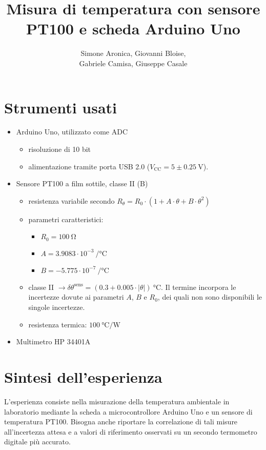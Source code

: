 \documentclass{article}
\title{Misura di temperatura con
sensore PT100 e
scheda Arduino Uno}
\author{Simone Aronica, Giovanni Bloise, \\
Gabriele Camisa, Giuseppe Casale}
\begin{document}
\maketitle
\tableofcontents
\pagebreak

\section{Strumenti usati}
\begin{itemize}
    \item Arduino Uno, utilizzato come ADC 
    \begin{itemize}
        \item risoluzione di 10 bit 
        \item alimentazione tramite porta USB 2.0 ($V_{\text{CC}} = 5 \pm \SI{0.25}{\volt}$).
    \end{itemize}
    \item Sensore PT100 a film sottile, classe II (B) 
    \begin{itemize}
        \item resistenza variabile secondo $R_{\theta}=R_0\cdot\left(1+A\cdot\theta+B\cdot\theta^2\right)$
        \item parametri caratteristici:
        \begin{itemize}
            \item $R_0=\SI{100}{\ohm}$
            \item $A=3.9083\cdot10^{-3}\SI{}{\per\celsius}$
            \item $B=-5.775\cdot10^{-7}\SI{}{\per\celsius}$
        \end{itemize}
    \item classe II $\rightarrow \delta\theta^\text{sens}=(0.3+0.005\cdot|\theta|)\SI{}{\celsius}$. Il termine incorpora le incertezze dovute ai parametri $A$, $B$ e $R_0$, dei quali non sono disponibili le singole incertezze.
    \item resistenza termica: $\SI{100}{\celsius\per\watt}$
    \end{itemize}
    \item Multimetro HP 34401A
\end{itemize}

\section{Sintesi dell'esperienza}
L'esperienza consiste nella misurazione della temperatura ambientale in laboratorio mediante la scheda a microcontrollore Arduino Uno e un sensore di temperatura PT100. Bisogna anche riportare la correlazione di tali misure all'incertezza attesa e a valori di riferimento osservati su un secondo termometro digitale più accurato.
\end{document}
